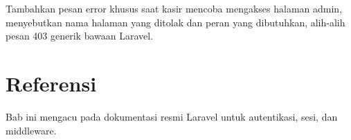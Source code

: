 \begin{challengebox}
Tambahkan pesan error khusus saat kasir mencoba mengakses halaman
admin, menyebutkan nama halaman yang ditolak dan peran yang dibutuhkan,
alih-alih pesan 403 generik bawaan Laravel.
\end{challengebox}

\section{Referensi}

Bab ini mengacu pada dokumentasi resmi Laravel \cite{laraveldocs} untuk
autentikasi, sesi, dan middleware.
